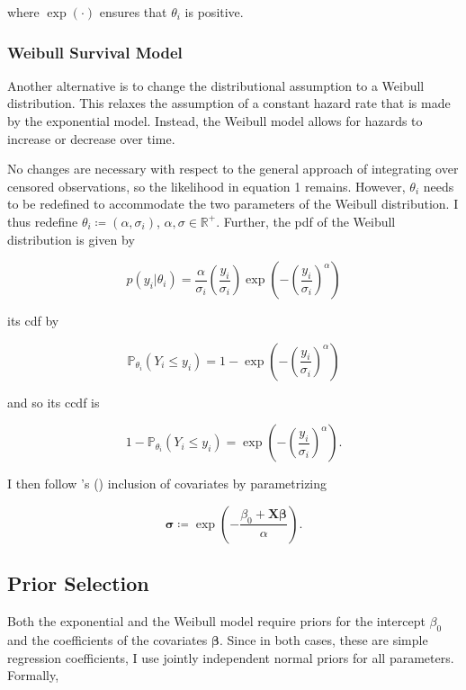 \documentclass[11pt]{article}
\newcommand\possecite[1]{\citeauthor{#1}'s (\citeyear{#1})}
\begin{document}
where $\exp(\cdot)$ ensures that $\theta_i$ is positive.

\subsubsection{Weibull Survival Model}
Another alternative is to change the distributional assumption to a Weibull distribution. This relaxes the assumption of a constant hazard rate that is made by the exponential model. Instead, the Weibull model allows for hazards to increase or decrease over time. 

No changes are necessary with respect to the general approach of integrating over censored observations, so the likelihood in equation 1 remains. However, $\theta_i$ needs to be redefined to accommodate the two parameters of the Weibull distribution. I thus redefine $\theta_i \coloneqq (\alpha, \sigma_i)$, $\alpha, \sigma \in \mathbb{R}^+$. Further, the pdf of the Weibull distribution is given by 

\begin{equation*}
    p(y_i|\theta_i) = \frac{\alpha}{\sigma_i} \left(\frac{y_i}{\sigma_i}\right) \exp\left(-\left(\frac{y_i}{\sigma_i}\right)^{\alpha}\right)
\end{equation*}

its cdf by

\begin{equation*}
    \mathbb{P}_{\theta_i}(Y_i \leq y_i) = 1 - \exp\left(-\left(\frac{y_i}{\sigma_i}\right)^{\alpha}\right)
\end{equation*}

and so its ccdf is

\begin{equation*}
    1 - \mathbb{P}_{\theta_i}(Y_i \leq y_i) = \exp\left(-\left(\frac{y_i}{\sigma_i}\right)^{\alpha}\right).
\end{equation*}

I then follow \possecite{biostan2021} inclusion of covariates by parametrizing 

\begin{equation*}
    \bm{\sigma} \coloneqq \exp\left(-\frac{\beta_0 + \bm{X}\bm{\beta}}{\alpha}\right).
\end{equation*}


\subsection{Prior Selection}
Both the exponential and the Weibull model require priors for the intercept $\beta_0$ and the coefficients of the covariates $\bm\beta$. Since in both cases, these are simple regression coefficients, I use jointly independent normal priors for all parameters. Formally, 
\end{document}
